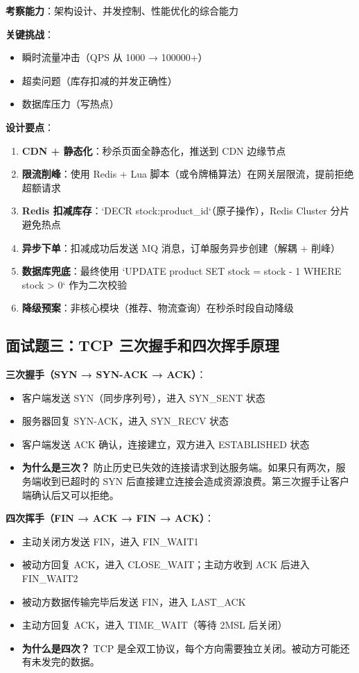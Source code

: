 \documentclass[12pt,UTF8]{ctexbook}
\begin{document}
\textbf{考察能力}：架构设计、并发控制、性能优化的综合能力

\textbf{关键挑战}：
\begin{itemize}
    \item 瞬时流量冲击（QPS 从 1000 → 100000+）
    \item 超卖问题（库存扣减的并发正确性）
    \item 数据库压力（写热点）
\end{itemize}

\textbf{设计要点}：
\begin{enumerate}
    \item \textbf{CDN + 静态化}：秒杀页面全静态化，推送到 CDN 边缘节点
    \item \textbf{限流削峰}：使用 Redis + Lua 脚本（或令牌桶算法）在网关层限流，提前拒绝超额请求
    \item \textbf{Redis 扣减库存}：`DECR stock:product_id`（原子操作），Redis Cluster 分片避免热点
    \item \textbf{异步下单}：扣减成功后发送 MQ 消息，订单服务异步创建（解耦 + 削峰）
    \item \textbf{数据库兜底}：最终使用 `UPDATE product SET stock = stock - 1 WHERE stock > 0` 作为二次校验
    \item \textbf{降级预案}：非核心模块（推荐、物流查询）在秒杀时段自动降级
\end{enumerate}

\subsection*{面试题三：TCP 三次握手和四次挥手原理}

\textbf{三次握手（SYN → SYN-ACK → ACK）}：
\begin{itemize}
    \item 客户端发送 SYN（同步序列号），进入 SYN\_SENT 状态
    \item 服务器回复 SYN-ACK，进入 SYN\_RECV 状态
    \item 客户端发送 ACK 确认，连接建立，双方进入 ESTABLISHED 状态
    \item \textbf{为什么是三次？} 防止历史已失效的连接请求到达服务端。如果只有两次，服务端收到已超时的 SYN 后直接建立连接会造成资源浪费。第三次握手让客户端确认后又可以拒绝。
\end{itemize}

\textbf{四次挥手（FIN → ACK → FIN → ACK）}：
\begin{itemize}
    \item 主动关闭方发送 FIN，进入 FIN\_WAIT1
    \item 被动方回复 ACK，进入 CLOSE\_WAIT；主动方收到 ACK 后进入 FIN\_WAIT2
    \item 被动方数据传输完毕后发送 FIN，进入 LAST\_ACK
    \item 主动方回复 ACK，进入 TIME\_WAIT（等待 2MSL 后关闭）
    \item \textbf{为什么是四次？} TCP 是全双工协议，每个方向需要独立关闭。被动方可能还有未发完的数据。
\end{itemize}
\end{document}
